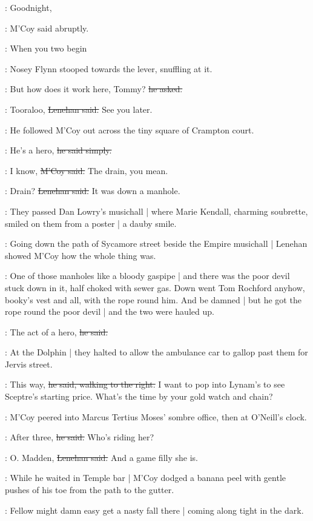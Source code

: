 \mcoy:
Goodnight,

:
M'Coy said abruptly.

\mcoy:
When you two begin

:
Nosey Flynn stooped towards the lever,
snuffling at it.

\nosey:
But how does it work here, Tommy?
\sout{he asked.}

\lenehan:
Tooraloo,
\sout{Lenehan said.}%
See you later.

:
He followed M'Coy out
across the tiny square of Crampton court.

\lenehan:
He's a hero,
\sout{he said simply.}

\mcoy:
I know,
\sout{M'Coy said.}
The drain, you mean.

\lenehan:
Drain?
\sout{Lenehan said.}
It was down a manhole.

:
They passed Dan Lowry's musichall |
where Marie Kendall,
charming soubrette,
smiled on them from a poster |
a dauby smile.

:
Going down the path of Sycamore street
beside the Empire musichall |
Lenehan showed M'Coy how the whole thing was.

\lenehan:
One of those manholes like a bloody gaspipe |
and there was the poor devil stuck down in it,
half choked with sewer gas.%
Down went Tom Rochford anyhow,
booky's vest and all,
with the rope round him.
And be damned |
but he got the rope round the poor devil |
and the two were hauled up.

\lenehan:
The act of a hero,
\sout{he said.}

:
At the Dolphin |
they halted to allow the ambulance car
to gallop past them for Jervis street.

\lenehan:
This way,
\sout{he said,
walking to the right.}
I want to pop into Lynam's
to see Sceptre's starting price.
What's the time by your gold watch and chain?

:
M'Coy peered into Marcus Tertius Moses' sombre office,
then at O'Neill's clock.

\mcoy:
After three,
\sout{he said.}%
Who's riding her?

\lenehan:
O. Madden,
\sout{Lenehan said.}
And a game filly she is.

:
While he waited in Temple bar |
M'Coy dodged a banana peel
with gentle pushes of his toe
from the path
to the gutter.

\mcoy:
Fellow might damn
easy get a nasty fall there |
coming along tight in the dark.

